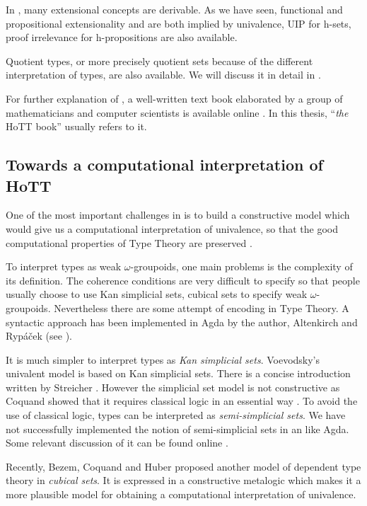 In \hott, many extensional concepts are derivable. As we have seen, functional and propositional extensionality and are both implied by univalence, UIP for h-sets, proof irrelevance for h-propositions are also available.

Quotient types, or more precisely quotient sets because of the different interpretation of types, are also available. We will discuss it in detail in .

For further explanation of \hott, a well-written text book elaborated by a group of mathematicians and computer scientists is available online \cite{hott}. In this thesis, “\emph{the} HoTT book” usually refers to it.

\subsection{Towards a computational interpretation of HoTT}

One of the most important challenges in \hott is to build a constructive model which would give us a computational interpretation of univalence, so that the good computational properties of Type Theory are preserved \cite{bezem2013model}. 




To interpret types as weak $\omega$-groupoids, one main problems is
the complexity of its definition. The
coherence conditions are very difficult to specify so that people usually choose to use Kan simplicial sets, cubical sets to specify weak $\omega$-groupoids.
Nevertheless there are some attempt of encoding \wog in Type Theory. 
 A syntactic approach has been implemented in Agda by the author, Altenkirch and Ryp\'{a}\v{c}ek (see ).

It is much simpler to interpret types as \emph{Kan simplicial sets}.
Voevodsky's univalent model \cite{klv:ssetmodel} is based on Kan simplicial sets. 
There is a concise introduction written by Streicher \cite{DBLP:dblp_journals/japll/Streicher14}. 
However the simplicial set model is not constructive as Coquand showed
that it requires classical logic in an essential way \cite{TC:sset}.
To avoid the use of classical logic, types can be interpreted as \emph{semi-simplicial sets}. We have not successfully implemented the notion of semi-simplicial sets in an \itt like Agda. Some relevant discussion of it can be found online \cite{ssSet}.

Recently, Bezem, Coquand and Huber \cite{bezem2013model} proposed another model of dependent type theory 
in \emph{cubical sets}. It is expressed in a constructive metalogic which makes it a more plausible model for obtaining a computational interpretation of univalence.

